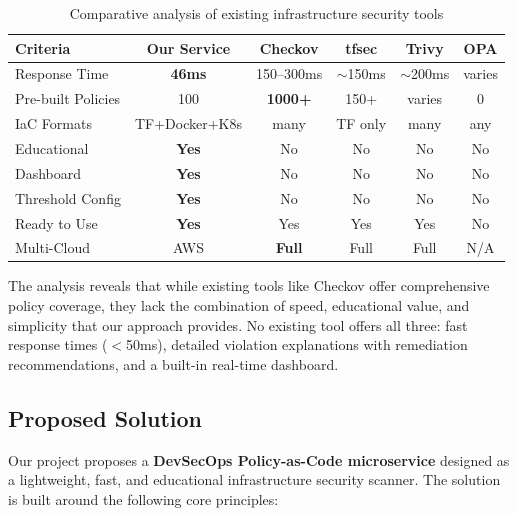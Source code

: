 \begin{table}[H]
\centering
\caption{Comparative analysis of existing infrastructure security tools}
\label{tab:comparison}
\small
\begin{tabular}{|p{3cm}|c|c|c|c|c|}
\hline
\textbf{Criteria} & \textbf{Our Service} & \textbf{Checkov} & \textbf{tfsec} & \textbf{Trivy} & \textbf{OPA} \\
\hline
Response Time & \cellcolor{green!15}\textbf{46ms} & 150--300ms & $\sim$150ms & $\sim$200ms & varies \\
\hline
Pre-built Policies & 100 & \cellcolor{green!15}\textbf{1000+} & 150+ & varies & 0 \\
\hline
IaC Formats & TF+Docker+K8s & \cellcolor{green!15}many & TF only & many & any \\
\hline
Educational & \cellcolor{green!15}\textbf{Yes} & No & No & No & No \\
\hline
Dashboard & \cellcolor{green!15}\textbf{Yes} & No & No & No & No \\
\hline
Threshold Config & \cellcolor{green!15}\textbf{Yes} & No & No & No & No \\
\hline
Ready to Use & \cellcolor{green!15}\textbf{Yes} & Yes & Yes & Yes & No \\
\hline
Multi-Cloud & AWS & \cellcolor{green!15}\textbf{Full} & Full & Full & N/A \\
\hline
\end{tabular}
\end{table}

\noindent The analysis reveals that while existing tools like Checkov offer comprehensive policy coverage, they lack the combination of speed, educational value, and simplicity that our approach provides. No existing tool offers all three: fast response times ($<$50ms), detailed violation explanations with remediation recommendations, and a built-in real-time dashboard.

\subsection{Proposed Solution}

Our project proposes a \textbf{DevSecOps Policy-as-Code microservice} designed as a lightweight, fast, and educational infrastructure security scanner. The solution is built around the following core principles:

